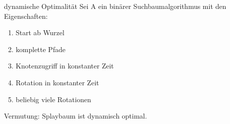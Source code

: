 \documentclass[11pt]{beamer}
\begin{document}
	\begin{frame} {dynamische Optimalität}
		Sei A ein binärer Suchbaumalgorithmus mit den Eigenschaften:
		\begin{enumerate}
			\item Start ab Wurzel
			\item komplette Pfade 
			\item Knotenzugriff in konstanter Zeit
			\item Rotation in konstanter Zeit
			\item beliebig viele Rotationen
		\end{enumerate}
		\pause
		Vermutung: Splaybaum ist dynamisch optimal.
		
	\end{frame}		
\end{document}
